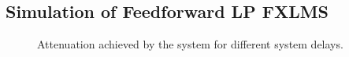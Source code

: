 \subsection{Simulation of Feedforward LP FXLMS}

\begin{figure}[H]
	\centering
	
	\caption{Attenuation achieved by the system for different system delays.}
	\label{Fig:Reference to noise ratio}
\end{figure}














